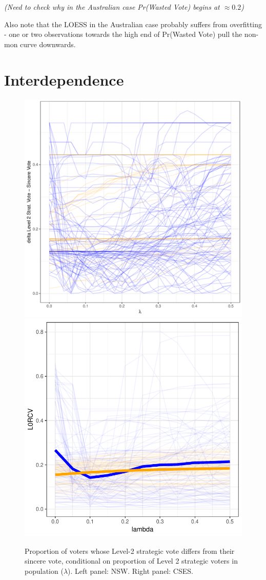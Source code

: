 \documentclass[11pt, letter, margin = 2 in]{article}
\begin{document}
\textit{(Need to check why in the Australian case Pr(Wasted Vote) begins at $\approx 0.2$)}

Also note that the LOESS in the Australian case probably suffers from overfitting - one or two observations towards the high end of Pr(Wasted Vote) pull the non-mon curve downwards.

\section{Interdependence}

\begin{figure}[!h]
	\centering
	\includegraphics[width = .45 \textwidth]{"../output/figures/level0_diff"}
	\includegraphics[width = .45 \textwidth]{"../output/figures/cses_l0"}
	\caption{Proportion of voters whose Level-2 strategic vote differs from their sincere vote, conditional on proportion of Level 2 strategic voters in population ($\lambda$). Left panel: NSW. Right panel: CSES.}
	\label{fig:figure1}
\end{figure}
\end{document}

